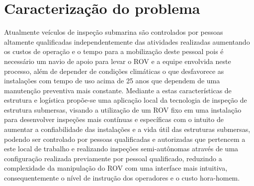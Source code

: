 \chapter{Caracterização do problema}
Atualmente veículos de inspeção submarina são controlados por pessoas altamente qualificadas independentemente das atividades realizadas aumentando os custos de operação e o tempo para a mobilização deste pessoal pois é necessário um navio de apoio para levar o ROV e a equipe envolvida neste processo, além de depender de condições climáticas o que desfavorece as instalações com tempo de uso acima de 25 anos que dependem de uma manutenção preventiva mais constante. Mediante a estas características de estrutura e logística propõe-se uma aplicação local da tecnologia de inspeção de estrutura submersas, visando a utilização de um ROV fixo em uma instalação para desenvolver inspeções mais contínuas e específicas com o intuito de aumentar a confiabilidade das instalações e a vida útil das estruturas submersas, podendo ser controlado por pessoas qualificadas e autorizadas que pertencem a este local de trabalho e realizando inspeções semi-autônomas através de uma configuração realizada previamente por pessoal qualificado, reduzindo a complexidade da manipulação do ROV com uma interface mais intuitiva, consequentemente o nível de instrução dos operadores e o custo hora-homem.   
